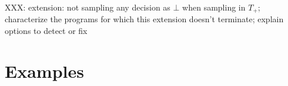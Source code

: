 XXX: extension: not sampling any decision as $\bot$ when sampling in $T_+$; characterize the programs for which this extension doesn't terminate; explain options to detect or fix

\section{Examples}

